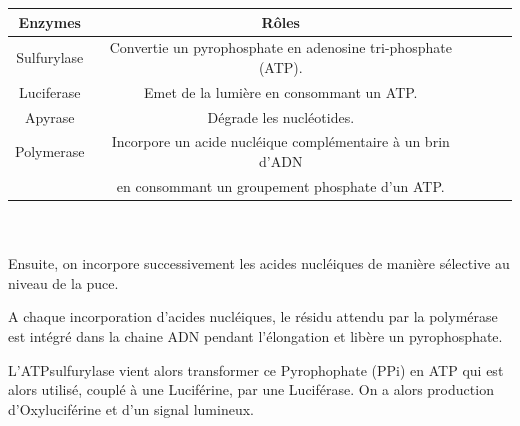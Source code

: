 \begin{tabular}{|c|c|c|c|c|}
	\hline
   Enzymes & Rôles \\
   \hline
   Sulfurylase & Convertie un pyrophosphate en adenosine tri-phosphate (ATP). \\
   \hline
   Luciferase & Emet de la lumière en consommant un ATP. \\
   \hline
   Apyrase & Dégrade les nucléotides. \\
   \hline
   Polymerase & Incorpore un acide nucléique complémentaire à un brin d'ADN \\&en consommant un groupement phosphate d'un ATP.\\
   \hline
\end{tabular}

~~\\
~~\\
Ensuite, on incorpore successivement les acides nucléiques de manière sélective au niveau de la puce.

A chaque incorporation d'acides nucléiques, le résidu attendu par la polymérase est intégré dans la chaine ADN pendant l'élongation et libère un pyrophosphate.

L’ATPsulfurylase vient alors transformer ce Pyrophophate (PPi) en ATP qui est alors utilisé, couplé à une Luciférine, par une Luciférase. On a alors production d’Oxyluciférine et d’un signal lumineux.

